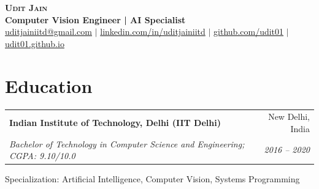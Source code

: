 \documentclass[a4paper,10pt]{article}
\makeatletter
\newcommand{\resumeItem}[1]{
  \item\small{#1 \vspace{-2pt}}
}
\newcommand{\resumeSubheading}[4]{
  \vspace{-1pt}\item
    \begin{tabular*}{0.97\textwidth}[t]{l@{\extracolsep{\fill}}r}
      \textbf{#1} & #2 \\
      \textit{\small#3} & \textit{\small #4} \\
    \end{tabular*}\vspace{-5pt}
}
\makeatother
\begin{document}
\begin{center}
    \textbf{\Huge \scshape Udit Jain} \\ \vspace{4pt}
    \textbf{Computer Vision Engineer | AI Specialist} \\ \vspace{4pt}
    \small \href{mailto:uditjainiitd@gmail.com}{uditjainiitd@gmail.com} $|$
    \href{https://www.linkedin.com/in/uditjainiitd/}{linkedin.com/in/uditjainiitd} $|$
    \href{https://github.com/udit01}{github.com/udit01} $|$
    \href{https://udit01.github.io}{udit01.github.io}
\end{center}


\section{Education}
  \resumeSubheading
    {Indian Institute of Technology, Delhi (IIT Delhi)}{New Delhi, India}
    {Bachelor of Technology in Computer Science and Engineering; CGPA: 9.10/10.0}{2016 -- 2020}
    \resumeItem{Specialization: Artificial Intelligence, Computer Vision, Systems Programming}


\end{document}

